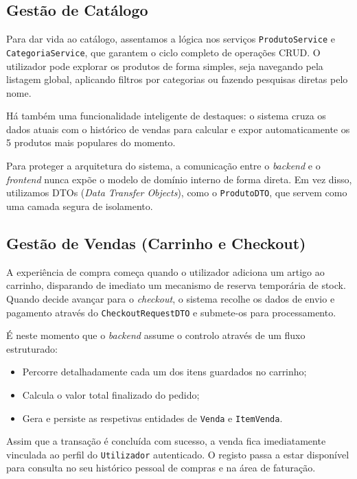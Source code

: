 \documentclass[11pt,a4paper,oneside]{report}
\begin{document}
\subsection{Gestão de Catálogo}

Para dar vida ao catálogo, assentamos a lógica nos serviços \texttt{ProdutoService} e \texttt{CategoriaService}, que garantem o ciclo completo de operações CRUD. O utilizador pode explorar os produtos de forma simples, seja navegando pela listagem global, aplicando filtros por categorias ou fazendo pesquisas diretas pelo nome. 

Há também uma funcionalidade inteligente de destaques: o sistema cruza os dados atuais com o histórico de vendas para calcular e expor automaticamente os 5 produtos mais populares do momento. 

Para proteger a arquitetura do sistema, a comunicação entre o \textit{backend} e o \textit{frontend} nunca expõe o modelo de domínio interno de forma direta. Em vez disso, utilizamos DTOs (\textit{Data Transfer Objects}), como o \texttt{ProdutoDTO}, que servem como uma camada segura de isolamento.

\subsection{Gestão de Vendas (Carrinho e Checkout)}

A experiência de compra começa quando o utilizador adiciona um artigo ao carrinho, disparando de imediato um mecanismo de reserva temporária de stock. Quando decide avançar para o \textit{checkout}, o sistema recolhe os dados de envio e pagamento através do \texttt{CheckoutRequestDTO} e submete-os para processamento.

É neste momento que o \textit{backend} assume o controlo através de um fluxo estruturado:
\begin{itemize}
    \item Percorre detalhadamente cada um dos itens guardados no carrinho;
    \item Calcula o valor total finalizado do pedido;
    \item Gera e persiste as respetivas entidades de \texttt{Venda} e \texttt{ItemVenda}.
\end{itemize}

Assim que a transação é concluída com sucesso, a venda fica imediatamente vinculada ao perfil do \texttt{Utilizador} autenticado. O registo passa a estar disponível para consulta no seu histórico pessoal de compras e na área de faturação.
\end{document}
